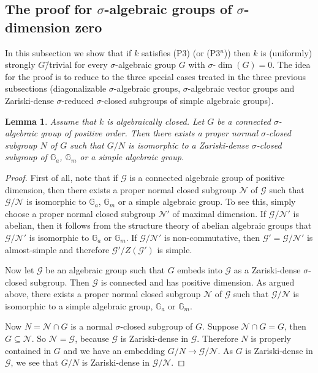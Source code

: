 \documentclass[oneside,reqno]{amsart}
\newtheorem{lemma}[theo]{Lemma}
\theoremstyle{definition}
\newcommand{\G}{\mathcal{G}}
\newcommand{\sdim}{\sigma\text{-}\dim}
\newcommand{\N}{\mathcal{N}}
\newcommand{\s}{\sigma}
\newcommand{\Gm}{\mathbb{G}_m}
\newcommand{\Ga}{\mathbb{G}_a}
\newcommand{\pt}{{\rm{(P3$^u$)}}}
\newcommand{\ptweak}{{\rm{(P3)}}}
\begin{document}
\subsection{The proof for $\s$-algebraic groups of $\s$-dimension zero}	

In this subsection we show that if $k$ satisfies \ptweak{} (or \pt{}) then $k$ is (uniformly) strongly $G$\=/trivial for every $\s$-algebraic group $G$ with $\sdim(G)=0$. The idea for the proof is to reduce to the three special cases treated in the three previous subsections (diagonalizable $\s$-algebraic groups, $\s$-algebraic vector groups and Zariski-dense $\s$-reduced $\s$-closed subgroups of simple algebraic groups).


\begin{lemma} \label{lemma: embedd into Ga Gm or simple}
	Assume that $k$ is algebraically closed. Let $G$ be a connected $\s$-algebraic group of positive order. Then there exists a proper normal $\s$-closed subgroup $N$ of $G$ such that $G/N$ is isomorphic to a Zariski-dense $\s$-closed subgroup of $\Ga$, $\Gm$ or a simple algebraic group.	
\end{lemma}
\begin{proof}
	First of all, note that if $\G$ is a connected algebraic group of positive dimension, then there exists a proper normal closed subgroup $\N$ of $\G$ such that $\G/\N$ is isomorphic to $\Ga$, $\Gm$ or a simple algebraic group. To see this, simply choose a proper normal closed subgroup $\N'$ of maximal dimension. If $\G/\N'$ is abelian, then it follows from the structure theory of abelian algebraic groups %
	\cite[Cor. 16.15]{Milne:AlgebraicGroups}
	that $\G/\N'$ is isomorphic to $\Ga$ or $\Gm$. If $\G/\N'$ is non-commutative, then $\G'=\G/\N'$ is almost-simple and therefore $\G'/Z(\G')$ is simple.
	
	Now let $\G$ be an algebraic group such that $G$ embeds into $\G$ as a Zariski-dense $\s$-closed subgroup. Then $\G$ is connected and has positive dimension. As argued above, there exists a proper normal closed subgroup $\N$ of $\G$ such that $\G/\N$ is isomorphic to a simple algebraic group, $\Ga$ or $\Gm$.
	
	Now $N=\N\cap G$ is a normal $\s$-closed subgroup of $G$. Suppose $\N\cap G=G$, then $G\subseteq\N$. So $\N=\G$, because $\G$ is Zariski-dense in $\G$. Therefore $N$ is properly contained in $G$ and we have an embedding $G/N\to\G/\N$. As $G$ is Zariski-dense in $\G$, we see that $G/N$ is Zariski-dense in $\G/\N$.
\end{proof}
\end{document}
